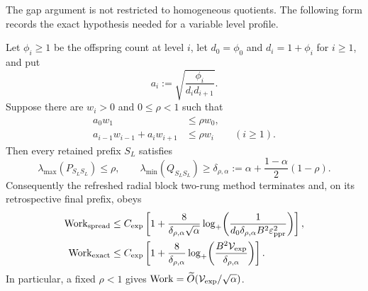 The gap argument is not restricted to homogeneous quotients.  The following
form records the exact hypothesis needed for a variable level profile.

\begin{theorem}
\label{thm:direct-variable-radial-supersolution}
Let $\phi_i\geq1$ be the offspring count at level $i$, let
$d_0=\phi_0$ and $d_i=1+\phi_i$ for $i\geq1$, and put
\begin{equation}
 a_i:=\sqrt{\frac{\phi_i}{d_i d_{i+1}}}.
 \label{eq:direct-variable-jacobi-edge}
\end{equation}
Suppose there are $w_i>0$ and $0\leq\rho<1$ such that
\begin{align}
 a_0w_1&\leq\rho w_0,
 \label{eq:direct-variable-supersolution-root}\\
 a_{i-1}w_{i-1}+a_iw_{i+1}&\leq\rho w_i
 \qquad(i\geq1).
 \label{eq:direct-variable-supersolution-bulk}
\end{align}
Then every retained prefix $S_L$ satisfies
\begin{equation}
 \lambda_{\max}(P_{S_LS_L})\leq\rho,
 \qquad
 \lambda_{\min}(Q_{S_LS_L})\geq
 \delta_{\rho,\alpha}
 :=\alpha+\frac{1-\alpha}{2}(1-\rho).
 \label{eq:direct-variable-gap}
\end{equation}
Consequently the refreshed radial block two-rung method terminates and, on
its retrospective final prefix, obeys
\begin{align}
 \operatorname{Work}_{\rm spread}
 &\leq C_{\rm exp}\left[1+
 \frac{8}{\delta_{\rho,\alpha}\sqrt\alpha}
 \log_+\!\left(
 \frac1{d_0\delta_{\rho,\alpha}B^2\varepsilon_{\mathrm{ppr}}^2}
 \right)\right],
 \label{eq:direct-variable-spread-work}\\
 \operatorname{Work}_{\rm exact}
 &\leq C_{\rm exp}\left[1+
 \frac8{\delta_{\rho,\alpha}}
 \log_+\!\left(
 \frac{B^2\mathcal V_{\rm exp}}{\delta_{\rho,\alpha}}
 \right)\right].
 \label{eq:direct-variable-exact-work}
\end{align}
In particular, a fixed $\rho<1$ gives
$\operatorname{Work}=\widetilde O(\mathcal V_{\rm exp}/\sqrt\alpha)$.
\end{theorem}

